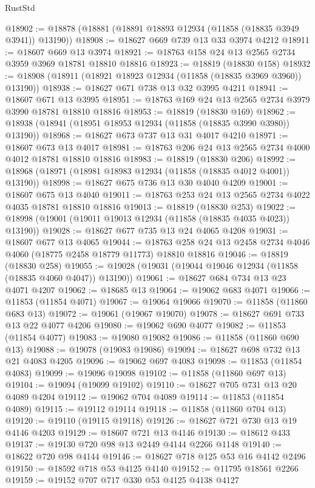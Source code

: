 \begin{lexlean}{RustStd}
\begin{coremodule}
@18902 := @18878 (@18881 (@18891 @18893 @12934 (@11858 (@18835 @3949 @3941)) @13190))
@18908 := @18627 @669 @739 @13 @33 @3974 @4212
@18911 := @18607 @669 @13 @3974
@18921 := @18763 @158 @24 @13 @2565 @2734 @3959 @3969 @18781 @18810 @18816
@18923 := @18819 (@18830 @158)
@18932 := @18908 (@18911 (@18921 @18923 @12934 (@11858 (@18835 @3969 @3960)) @13190))
@18938 := @18627 @671 @738 @13 @32 @3995 @4211
@18941 := @18607 @671 @13 @3995
@18951 := @18763 @169 @24 @13 @2565 @2734 @3979 @3990 @18781 @18810 @18816
@18953 := @18819 (@18830 @169)
@18962 := @18938 (@18941 (@18951 @18953 @12934 (@11858 (@18835 @3990 @3980)) @13190))
@18968 := @18627 @673 @737 @13 @31 @4017 @4210
@18971 := @18607 @673 @13 @4017
@18981 := @18763 @206 @24 @13 @2565 @2734 @4000 @4012 @18781 @18810 @18816
@18983 := @18819 (@18830 @206)
@18992 := @18968 (@18971 (@18981 @18983 @12934 (@11858 (@18835 @4012 @4001)) @13190))
@18998 := @18627 @675 @736 @13 @30 @4040 @4209
@19001 := @18607 @675 @13 @4040
@19011 := @18763 @253 @24 @13 @2565 @2734 @4022 @4035 @18781 @18810 @18816
@19013 := @18819 (@18830 @253)
@19022 := @18998 (@19001 (@19011 @19013 @12934 (@11858 (@18835 @4035 @4023)) @13190))
@19028 := @18627 @677 @735 @13 @24 @4065 @4208
@19031 := @18607 @677 @13 @4065
@19044 := @18763 @258 @24 @13 @2458 @2734 @4046 @4060 (@18775 @2458 @18779 @11773) @18810 @18816
@19046 := @18819 (@18830 @258)
@19055 := @19028 (@19031 (@19044 @19046 @12934 (@11858 (@18835 @4060 @4047)) @13190))
@19061 := @18627 @684 @734 @13 @23 @4071 @4207
@19062 := @18685 @13
@19064 := @19062 @683 @4071
@19066 := @11853 (@11854 @4071)
@19067 := @19064 @19066
@19070 := @11858 (@11860 @683 @13)
@19072 := @19061 (@19067 @19070)
@19078 := @18627 @691 @733 @13 @22 @4077 @4206
@19080 := @19062 @690 @4077
@19082 := @11853 (@11854 @4077)
@19083 := @19080 @19082
@19086 := @11858 (@11860 @690 @13)
@19088 := @19078 (@19083 @19086)
@19094 := @18627 @698 @732 @13 @21 @4083 @4205
@19096 := @19062 @697 @4083
@19098 := @11853 (@11854 @4083)
@19099 := @19096 @19098
@19102 := @11858 (@11860 @697 @13)
@19104 := @19094 (@19099 @19102)
@19110 := @18627 @705 @731 @13 @20 @4089 @4204
@19112 := @19062 @704 @4089
@19114 := @11853 (@11854 @4089)
@19115 := @19112 @19114
@19118 := @11858 (@11860 @704 @13)
@19120 := @19110 (@19115 @19118)
@19126 := @18627 @721 @730 @13 @19 @4146 @4203
@19129 := @18607 @721 @13 @4146
@19130 := @18612 @433
@19137 := @19130 @720 @98 @13 @2449 @4144 @2266 @1148
@19140 := @18622 @720 @98 @4144
@19146 := @18627 @718 @125 @53 @16 @4142 @2496
@19150 := @18592 @718 @53 @4125 @4140
@19152 := @11795 @18561 @2266
@19159 := @19152 @707 @717 @330 @53 @4125 @4138 @4127

\end{coremodule}
\end{lexlean}
